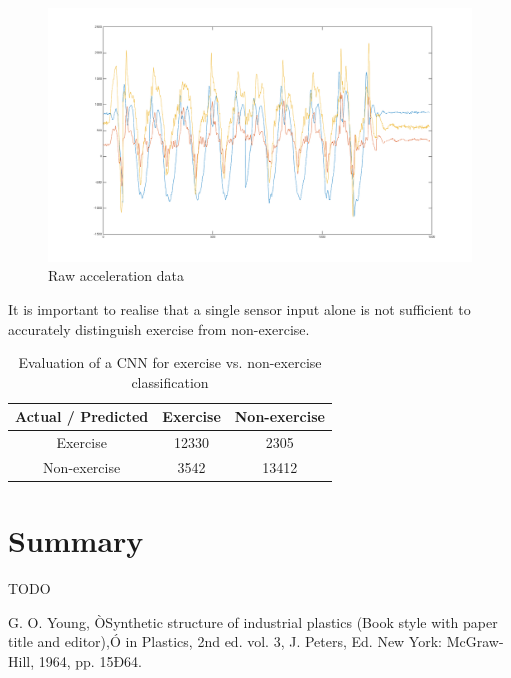 \documentclass[a4paper, 10 pt, conference]{IEEEtran}
\begin{document}
\begin{figure}[hb]
	\begin{center}
		\includegraphics[scale=0.2]{ri-raw-acceleration.png}
		\caption{Raw acceleration data}
		\label{raw-acceleration}
	\end{center}
\end{figure}


It is important to realise that a single sensor input alone is not sufficient to accurately distinguish exercise from non-exercise. 

\begin{table}[h]
\caption{Evaluation of a CNN for exercise vs. non-exercise classification}
\label{exercise}
\begin{center}
\begin{tabular}{|c||c||c|}
\hline
Actual / Predicted & Exercise & Non-exercise\\
\hline
Exercise & 12330 & 2305\\
\hline
Non-exercise & 3542 & 13412\\
\hline
\end{tabular}
\end{center}
\end{table}

\section{Summary}

TODO

\addtolength{\textheight}{-12cm}  %

\begin{thebibliography}{99}

 G. O. Young, ÒSynthetic structure of industrial plastics (Book style with paper title and editor),Ó 	in Plastics, 2nd ed. vol. 3, J. Peters, Ed.  New York: McGraw-Hill, 1964, pp. 15Ð64.

\end{thebibliography}
\end{document}
